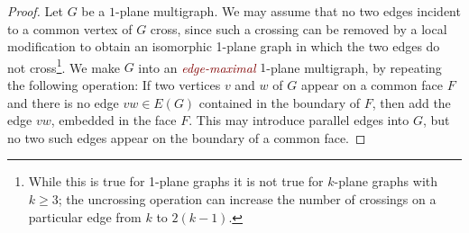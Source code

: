 \documentclass{patmorin}
\theoremstyle{plain}
\theoremstyle{definition}
\newcommand{\defin}[1]{\textcolor{Maroon}{\emph{#1}}}
\renewcommand{\ge}{\geqslant}
\begin{document}
\begin{proof}
Let $G$ be a $1$-plane multigraph. We may assume that no two edges incident to a common vertex of $G$ cross, since such a crossing can be removed by a local modification to obtain an isomorphic 1-plane graph in which the two edges do not cross\footnote{While this is true for 1-plane graphs it is not true for $k$-plane graphs with $k\ge 3$; the uncrossing operation can increase the number of crossings on a particular edge from $k$ to $2(k-1)$.}.
We make $G$ into an \defin{edge-maximal} $1$-plane multigraph, by repeating the following operation:  If two vertices $v$ and $w$ of $G$ appear on a common face $F$ and there is no edge $vw\in E(G)$ contained in the boundary of $F$, then add the edge $vw$, embedded in the face $F$.  This may introduce parallel edges into $G$, but no two such edges  appear on the boundary of a common face.


\end{proof}
\end{document}
